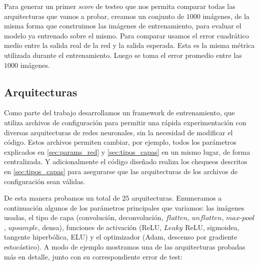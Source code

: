 Para generar un primer \emph{score} de testeo que nos permita comparar todas las arquitecturas que vamos a probar, creamos un conjunto de $1000$ imágenes, de la misma forma que construimos las imágenes de entrenamiento, para evaluar el modelo ya entrenado sobre el mismo. Para comparar usamos el error cuadrático medio entre la salida real de la red y la salida esperada. Esta es la misma métrica utilizada durante el entrenamiento. Luego se toma el error promedio entre las $1000$ imágenes.

\subsection{Arquitecturas}

Como parte del trabajo desarrollamos un framework de entrenamiento, que utiliza archivos de configuración para permitir una rápida experimentación con diversas arquitecturas de redes neuronales, sin la necesidad de modificar el código. Estos archivos permiten cambiar, por ejemplo, todos los parámetros explicados en \ref{sec:params_red} y \ref{sec:tipos_capas} en un mismo lugar, de forma centralizada. Y adicionalmente el código diseñado realiza los chequeos descritos en \ref{sec:tipos_capas} para asegurarse que las arquitecturas de los archivos de configuración sean válidas.

De esta manera probamos un total de $25$ arquitecturas. Enumeramos a continuación algunos de los parámetros principales que variamos: las imágenes usadas, el tipo de capa (convolución, deconvolución, $flatten$, $unflatten$, $max$-$pool$, $upsample$, densa), funciones de activación (ReLU, $Leaky$ ReLU, sigmoidea, tangente hiperbólica, ELU) y el optimizador (Adam, descenso por gradiente estocástico). A modo de ejemplo mostramos una de las arquitecturas probadas más en detalle, junto con su correspondiente error de test:

